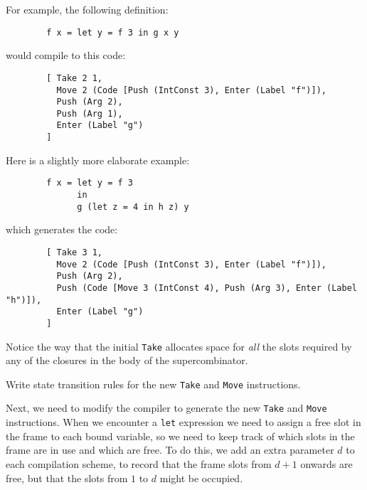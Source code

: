 For example, the following definition:
\begin{verbatim}
        f x = let y = f 3 in g x y
\end{verbatim}
would compile to this code:
\begin{verbatim}
        [ Take 2 1,
          Move 2 (Code [Push (IntConst 3), Enter (Label "f")]),
          Push (Arg 2),
          Push (Arg 1),
          Enter (Label "g")
        ]
\end{verbatim}
Here is a slightly more elaborate example:
\begin{verbatim}
        f x = let y = f 3
              in
              g (let z = 4 in h z) y
\end{verbatim}
which generates the code:
\begin{verbatim}
        [ Take 3 1,
          Move 2 (Code [Push (IntConst 3), Enter (Label "f")]),
          Push (Arg 2),
          Push (Code [Move 3 (IntConst 4), Push (Arg 3), Enter (Label "h")]),
          Enter (Label "g")
        ]
\end{verbatim}
Notice the way that the initial \mbox{\tt Take} allocates space for {\em all\/} the
slots required by any of the closures in the body of the supercombinator.

\begin{exercise}
Write state transition rules for the new \mbox{\tt Take} and \mbox{\tt Move} instructions.
\end{exercise}

Next, we need to modify the compiler to generate the new \mbox{\tt Take} and \mbox{\tt Move}
instructions.
When we encounter a \mbox{\tt let} expression we need to assign a free slot in the
frame to each bound variable, so we
need to keep track of which slots in the
frame are in use and which are free.
To do this, we add an extra parameter $d$ to each compilation scheme,
to record that the frame slots from $d+1$ onwards are free, but that
the slots from $1$ to $d$ might be occupied.

